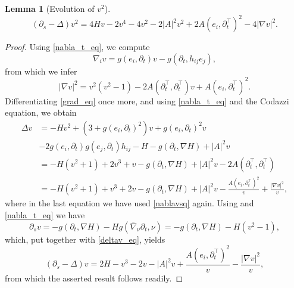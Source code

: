\documentclass[leqno,11pt]{amsart}
\newtheorem{lemma}[theorem]{Lemma}
\theoremstyle{definition}
\newcommand{\p}{\partial}
\begin{document}
\begin{lemma}[Evolution of $v^2$]
\begin{equation}\label{vsq_eq}
\left(\partial_s-\Delta\right)v^2 =4Hv-2v^4-4v^2-2|A|^2v^2+2A(e_i,\p_t^{\top})^2-4|\nabla v|^2.
\end{equation}
\end{lemma}
\begin{proof}
Using \eqref{nabla_t_eq}, we compute
\begin{equation}\label{grad_eq}
\nabla_{i}v=g(e_i,\p_t)v-g(\partial_t,h_{ij}e_j), 
\end{equation}
from which we infer
\begin{equation}\label{nablavsq}
|\nabla v|^2  = v^2(v^2-1)-2A\left(\p_t^{\top},\p_t^{\top}\right)v+A\left(e_i,\partial_t^{\top}\right)^2.
\end{equation}
Differentiating \eqref{grad_eq} once more, and using \eqref{nabla_t_eq} and the Codazzi equation,  we obtain
\begin{align}\label{deltav_eq}
\Delta v&=-Hv^2\nonumber+(3+g(e_i,\p_t)^2)v+ g(e_i,\p_t)^2v \nonumber \\
&-2g(e_i,\p_t)g(e_j,\p_t)h_{ij}-H-g(\p_t,\nabla H)+|A|^2v\\
&=-H(v^2+1)+2v^3+v\nonumber -g(\partial_t,\nabla H)+|A|^2v -2 A(\partial_t^{\top},\p_t^{\top})\\
&= -H(v^2+1)+v^3+2v\nonumber -g(\partial_t,\nabla H)+|A|^2v-\frac{A\left(e_i,\partial_t^{\top}\right)^2}{v}+\frac{|\nabla v|^2}{v},
\end{align}
where in the last equation we have used \eqref{nablavsq} again. 
Using \cite[Proposition 3.1]{Ecker_Huisken_lor} and \eqref{nabla_t_eq} we have
\begin{equation}\label{vtime_der}
\partial_{s}v=-g( \p_t, \nabla H)-Hg\left(\bar{\nabla}_{\nu}\partial_t,\nu \right)=-g( \p_t, \nabla H)-H(v^2-1),
\end{equation}
which, put together with \eqref{deltav_eq}, yields
\begin{equation}
\left(\partial_s-\Delta\right)v =2H-v^3-2v-|A|^2v+\frac{A(e_i,\p_t^{\top})^2}{v}-\frac{|\nabla v|^2}{v},
\end{equation}
from which the asserted result follows readily. 
\end{proof}
\end{document}
